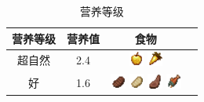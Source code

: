 \begin{table}[H]
    \centering
    \caption{营养等级}
    \setlength{\tabcolsep}{4mm}
    \begin{tabular}{c|c|cc}
        \toprule
        \textbf{营养等级} & \textbf{营养值} & \textbf{食物} \\
        \midrule
        超自然 & 2.4 & \includegraphics[width=0.5cm,height=0.5cm]{./images/origin/golden_apple.png}  \includegraphics[width=0.5cm,height=0.5cm]{./images/origin/golden_carrot.png} \\
        好 & 1.6 & \includegraphics[width=0.5cm,height=0.5cm]{./images/origin/cooked_beef.png} \includegraphics[width=0.5cm,height=0.5cm]{./images/origin/cooked_porkchop.png} \includegraphics[width=0.5cm,height=0.5cm]{./images/origin/cooked_mutton.png} \includegraphics[width=0.5cm,height=0.5cm]{./images/origin/cooked_salmon.png}\\

\end{tabular}
\end{table}
